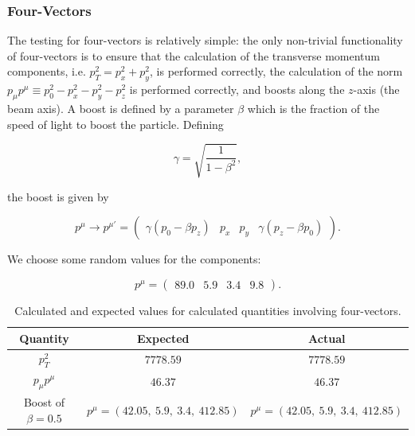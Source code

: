 \subsubsection{Four-Vectors}

The testing for four-vectors is relatively simple: the only non-trivial functionality of four-vectors is to ensure that the calculation of the transverse momentum components, i.e. $p_T^2 = p_x^2 + p_y^2$, is performed correctly, the calculation of the norm $p_\mu p^\mu \equiv p_0^2 - p_x^2 - p_y^2 - p_z^2$ is performed correctly, and boosts along the $z$-axis (the beam axis). A boost is defined by a parameter $\beta$ which is the fraction of the speed of light to boost the particle. Defining

\begin{equation}
  \gamma = \sqrt{\frac{1}{1-\beta^2}},
\end{equation}

the boost is given by

\begin{equation}
  p^\mu \rightarrow p^{\mu\prime} = \begin{pmatrix}\gamma (p_0 - \beta p_z) & p_x & p_y & \gamma(p_z - \beta p_0)\end{pmatrix}.
\end{equation}

We choose some random values for the components:

\begin{equation}
  p^\mu = \begin{pmatrix}89.0 & 5.9 & 3.4 & 9.8\end{pmatrix}.
\end{equation}

\begin{table}[ht]
  \centering
  \begin{tabular}{|c|c|c|}
    \hline
    Quantity & Expected & Actual \\ \hline
    $p_T^2$ & $7778.59$ & $7778.59$ \\ \hline
    $p_\mu p^\mu$ & $46.37$ & $46.37$ \\ \hline
    Boost of $\beta = 0.5$ & $p^\mu = (42.05,\ 5.9,\ 3.4,\ 412.85)$ & $p^\mu = (42.05,\ 5.9,\ 3.4,\ 412.85)$ \\ \hline
  \end{tabular}
  \caption{Calculated and expected values for calculated quantities involving four-vectors.}
  \label{tbl:four-vector-tests}
\end{table}

